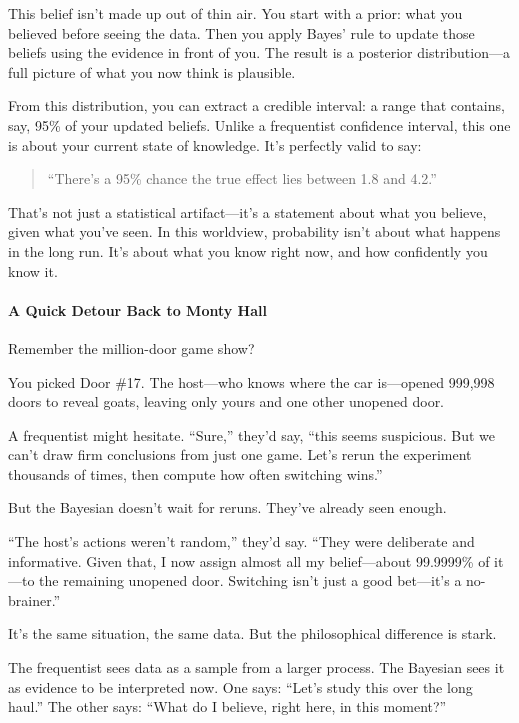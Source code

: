 This belief isn’t made up out of thin air. You start with a prior: what you believed before seeing the data. Then you apply Bayes’ rule to update those beliefs using the evidence in front of you. The result is a posterior distribution—a full picture of what you now think is plausible.

From this distribution, you can extract a credible interval: a range that contains, say, 95\% of your updated beliefs. Unlike a frequentist confidence interval, this one is about your current state of knowledge. It’s perfectly valid to say:  
\begin{quote}
“There’s a 95\% chance the true effect lies between 1.8 and 4.2.”  
\end{quote}

That’s not just a statistical artifact—it’s a statement about what you believe, given what you’ve seen. In this worldview, probability isn’t about what happens in the long run. It’s about what you know right now, and how confidently you know it.

\paragraph{A Quick Detour Back to Monty Hall}

Remember the million-door game show?

You picked Door \#17. The host—who knows where the car is—opened 999,998 doors to reveal goats, leaving only yours and one other unopened door.

A frequentist might hesitate. “Sure,” they’d say, “this seems suspicious. But we can’t draw firm conclusions from just one game. Let’s rerun the experiment thousands of times, then compute how often switching wins.”

But the Bayesian doesn’t wait for reruns. They’ve already seen enough.

“The host’s actions weren’t random,” they’d say. “They were deliberate and informative. Given that, I now assign almost all my belief—about 99.9999\% of it—to the remaining unopened door. Switching isn’t just a good bet—it’s a no-brainer.”

It’s the same situation, the same data. But the philosophical difference is stark.

The frequentist sees data as a sample from a larger process. The Bayesian sees it as evidence to be interpreted now. One says: “Let’s study this over the long haul.” The other says: “What do I believe, right here, in this moment?”

